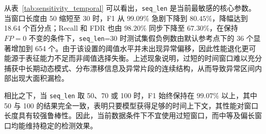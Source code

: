 \documentclass[bachelor, vlined]{DissertUESTC}
\begin{document}
    \begin{table}[htbp]
        \centering
        \caption{时间上下文与再遮挡比例的参数敏感性结果}
        \label{tab:sensitivity_temporal}
        \small
        \setlength{\tabcolsep}{5pt}
        \renewcommand{\arraystretch}{1.15}
    \end{table}
    
    从表~\ref{tab:sensitivity_temporal} 可以看出，\texttt{seq\_len} 是当前最敏感的核心参数。当窗口长度由 50 缩短至 30 时，F1 从 \(99.09\%\) 急剧下降到 \(80.45\%\)，降幅达到 18.64 个百分点；Recall 和 FDR 也由 \(98.20\%\) 同步下降至 \(67.30\%\)，在保持 \(FP=0\) 不变的条件下，\texttt{seq\_len}=30 时测试集假负例数由默认参考点下的 36 个显著增加到 654 个。由于该设置的阈值水平并未出现异常偏移，因此性能退化更可能源于表征能力不足而非阈值选择失衡。上述现象说明，过短的时间窗口难以充分捕获中长期动态模式、分布漂移信息及异常片段的连续结构，从而导致异常区间内部出现大面积漏检。
    
    相比之下，当 \texttt{seq\_len} 取 50、70 或 100 时，F1 始终保持在 \(99.07\%\) 以上，其中 50 与 100 的结果完全一致，表明只要模型获得足够的时间上下文，其性能对窗口长度具有较强鲁棒性。因此，当前数据条件下不宜使用过短窗口，而中等及偏长窗口均能维持稳定的检测效果。
    
\end{document}
